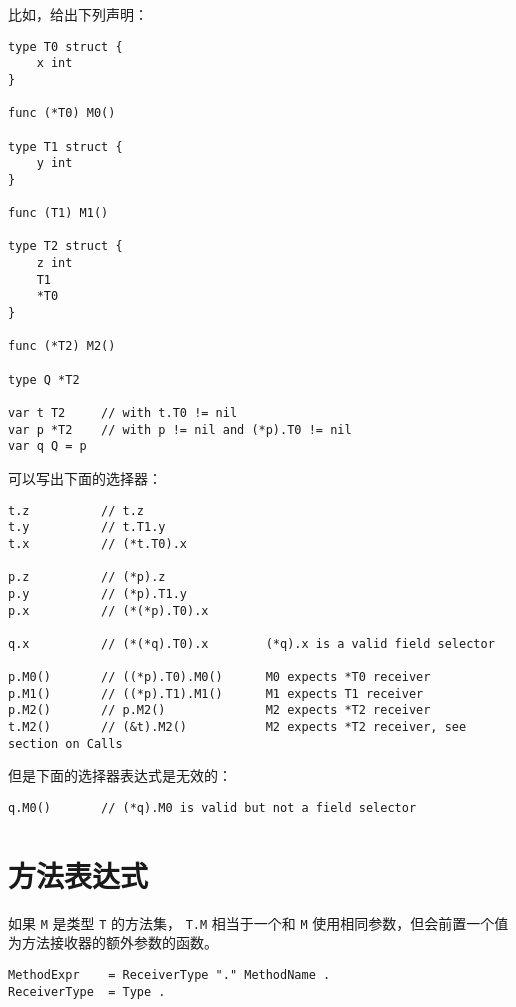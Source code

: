 比如，给出下列声明：
\begin{lstlisting}[style=golang]
type T0 struct {
	x int
}

func (*T0) M0()

type T1 struct {
	y int
}

func (T1) M1()

type T2 struct {
	z int
	T1
	*T0
}

func (*T2) M2()

type Q *T2

var t T2     // with t.T0 != nil
var p *T2    // with p != nil and (*p).T0 != nil
var q Q = p
\end{lstlisting}

可以写出下面的选择器：
\begin{lstlisting}[style=golang]
t.z          // t.z
t.y          // t.T1.y
t.x          // (*t.T0).x

p.z          // (*p).z
p.y          // (*p).T1.y
p.x          // (*(*p).T0).x

q.x          // (*(*q).T0).x        (*q).x is a valid field selector

p.M0()       // ((*p).T0).M0()      M0 expects *T0 receiver
p.M1()       // ((*p).T1).M1()      M1 expects T1 receiver
p.M2()       // p.M2()              M2 expects *T2 receiver
t.M2()       // (&t).M2()           M2 expects *T2 receiver, see section on Calls
\end{lstlisting}
但是下面的选择器表达式是无效的：
\begin{lstlisting}[style=golang]
q.M0()       // (*q).M0 is valid but not a field selector
\end{lstlisting}

\section{方法表达式}
如果 \lstinline|M| 是类型 \lstinline|T| 的方法集，
\lstinline|T.M| 相当于一个和 \lstinline|M| 使用相同参数，但会前置一个值为方法接收器的额外参数的函数。
\begin{lstlisting}[style=EBNF]
MethodExpr    = ReceiverType "." MethodName .
ReceiverType  = Type .
\end{lstlisting}

